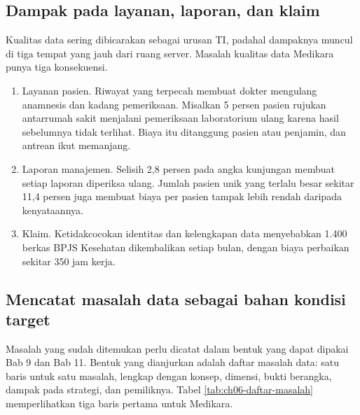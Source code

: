 \subsection*{Dampak pada layanan, laporan, dan klaim}

Kualitas data sering dibicarakan sebagai urusan TI, padahal dampaknya muncul
di tiga tempat yang jauh dari ruang server. Masalah kualitas data Medikara
punya tiga konsekuensi.

\begin{enumerate}
  \item Layanan pasien. Riwayat yang terpecah membuat dokter mengulang
        anamnesis dan kadang pemeriksaan. Misalkan 5 persen pasien rujukan
        antarrumah sakit menjalani pemeriksaan laboratorium ulang karena
        hasil sebelumnya tidak terlihat. Biaya itu ditanggung pasien atau
        penjamin, dan antrean ikut memanjang.
  \item Laporan manajemen. Selisih 2,8 persen pada angka kunjungan membuat
        setiap laporan diperiksa ulang. Jumlah pasien unik yang terlalu besar
        sekitar 11,4 persen juga membuat biaya per pasien tampak lebih rendah
        daripada kenyataannya.
  \item Klaim. Ketidakcocokan identitas dan kelengkapan data menyebabkan 1.400
        berkas BPJS Kesehatan dikembalikan setiap bulan, dengan biaya
        perbaikan sekitar 350 jam kerja.
\end{enumerate}

\subsection*{Mencatat masalah data sebagai bahan kondisi target}

Masalah yang sudah ditemukan perlu dicatat dalam bentuk yang dapat dipakai Bab
9 dan Bab 11. Bentuk yang dianjurkan adalah daftar masalah data: satu baris
untuk satu masalah, lengkap dengan konsep, dimensi, bukti berangka, dampak pada
strategi, dan pemiliknya. Tabel \ref{tab:ch06-daftar-masalah} memperlihatkan
tiga baris pertama untuk Medikara.

